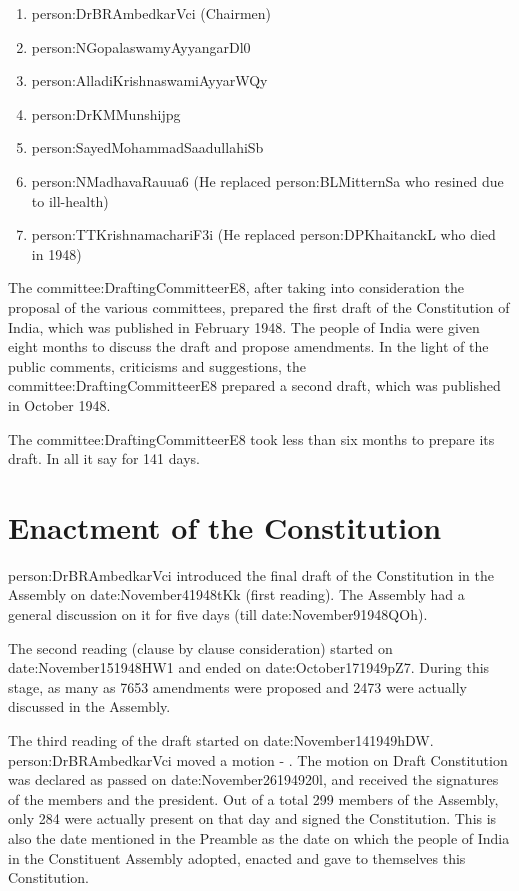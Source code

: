 \begin{enumerate}
  \item \gls{person:DrBRAmbedkarVci} ({ Chairmen})
  \item \gls{person:NGopalaswamyAyyangarDl0}
  \item \gls{person:AlladiKrishnaswamiAyyarWQy}
  \item \gls{person:DrKMMunshijpg}
  \item \gls{person:SayedMohammadSaadullahiSb}
  \item \gls{person:NMadhavaRauua6} (He replaced \gls{person:BLMitternSa} who resined due to ill-health)
  \item \gls{person:TTKrishnamachariF3i} (He replaced \gls{person:DPKhaitanckL} who died in 1948)
\end{enumerate}

The \gls{committee:DraftingCommitteerE8}, after taking into consideration the proposal of the various committees, prepared the first draft of the Constitution of India, which was published in February 1948. The people of India were given eight months to discuss the draft and propose amendments. In the light of the public comments, criticisms and suggestions, the \gls{committee:DraftingCommitteerE8} prepared a second draft, which was published in October 1948.

The \gls{committee:DraftingCommitteerE8} took less than six months to prepare its draft. In all it say for 141 days.

\section{Enactment of the Constitution}

\gls{person:DrBRAmbedkarVci} introduced the final draft of the Constitution in the Assembly on \gls{date:November41948tKk} (first reading). The Assembly had a general discussion on it for five days (till \gls{date:November91948QOh}).

The second reading (clause by clause consideration) started on \gls{date:November151948HW1} and ended on \gls{date:October171949pZ7}. During this stage, as many as 7653 amendments were proposed and 2473 were actually discussed in the Assembly.

The third reading of the draft started on \gls{date:November141949hDW}. \gls{person:DrBRAmbedkarVci} moved a motion - . The motion on Draft Constitution was declared as passed on \gls{date:November26194920l}, and received the signatures of the members and the president. Out of a total 299 members of the Assembly, only 284 were actually present on that day and signed the Constitution. This is also the date mentioned in the Preamble as the date on which the people of India in the Constituent Assembly adopted, enacted and gave to themselves this Constitution.

